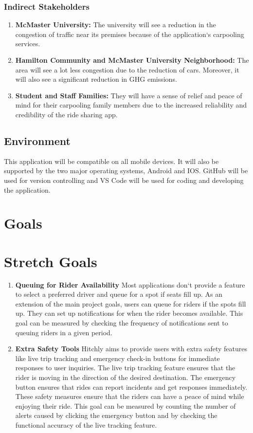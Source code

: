 \documentclass{article}
\begin{document}
\subsubsection{Indirect Stakeholders}
\begin{enumerate}
\item \textbf{McMaster University:} The university will see a reduction in the congestion of traffic near its premises because of the application`s carpooling services.
\item \textbf{Hamilton Community and McMaster University Neighborhood:} The area will see a lot less congestion due to the reduction of cars. Moreover, it will also see a significant reduction in GHG emissions.  
\item \textbf{Student and Staff Families:} They will have a sense of relief and peace of mind for their carpooling family members due to the increased reliability and credibility of the ride sharing app. 
\end{enumerate}

\subsection{Environment}
This application will be compatible on all mobile devices. It will also be supported by the two major operating systems, Android and IOS. GitHub will be used for version controlling and VS Code will be used for coding and developing the application.

\section{Goals}

\section{Stretch Goals}
\begin{enumerate}
\item \textbf{Queuing for Rider Availability}
Most applications don`t provide a feature to select a preferred driver and queue for a spot if seats fill up. As an extension of the main project goals, users can queue for riders if the spots fill up. They can set up notifications for when the rider becomes available. This goal can be measured by checking the frequency of notifications sent to queuing riders in a given period. 
\item \textbf{Extra Safety Tools}
Hitchly aims to provide users with extra safety features like live trip tracking and emergency check-in buttons for immediate responses to user inquiries. The live trip tracking feature ensures that the rider is moving in the direction of the desired destination. The emergency button ensures that rides can report incidents and get responses immediately. These safety measures ensure that the riders can have a peace of mind while enjoying their ride. This goal can be measured by counting the number of alerts caused by clicking the emergency button and by checking the functional accuracy of the live tracking feature. 
\end{enumerate}
\end{document}
